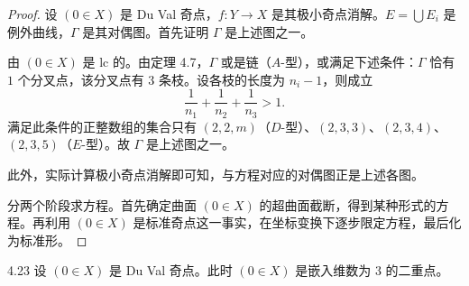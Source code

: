 \begin{proof}
设 $(0\in X)$ 是 Du Val 奇点，$f\colon Y\to X$ 是其极小奇点消解。$E=\bigcup E_i$ 是例外曲线，$\Gamma$ 是其对偶图。首先证明 $\Gamma$ 是上述图之一。

由 $(0\in X)$ 是 lc 的。由定理 4.7，$\Gamma$ 或是链（$A$-型），或满足下述条件：$\Gamma$ 恰有 $1$ 个分叉点，该分叉点有 $3$ 条枝。设各枝的长度为 $n_i-1$，则成立
\[
\frac1{n_1}+\frac1{n_2}+\frac1{n_3}>1 .
\]
满足此条件的正整数组的集合只有 $(2,2,m)$（$D$-型）、$(2,3,3)$、$(2,3,4)$、
$(2,3,5)$（$E$-型）。故 $\Gamma$ 是上述图之一。

此外，实际计算极小奇点消解即可知，与方程对应的对偶图正是上述各图。

分两个阶段求方程。首先确定曲面 $(0\in X)$ 的超曲面截断，得到某种形式的方程。再利用 $(0\in X)$ 是标准奇点这一事实，在坐标变换下逐步限定方程，最后化为标准形。
\end{proof}

\begin{lemmap}{4.23}
设 $(0\in X)$ 是 Du Val 奇点。此时 $(0\in X)$ 是嵌入维数为 $3$ 的二重点。
\end{lemmap}

